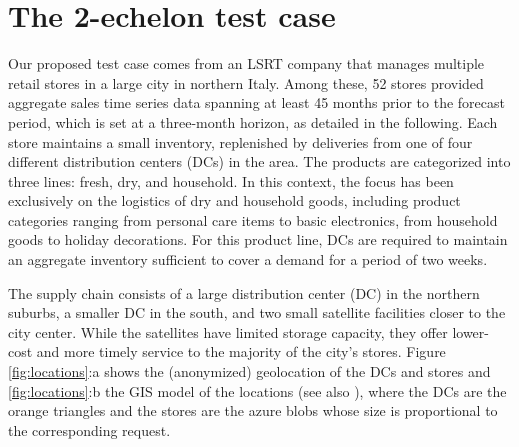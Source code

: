 \documentclass[preprint,11pt,authoryear]{elsarticle}
\begin{document}


\section{The 2-echelon test case} \label{Sec:testcase}

Our proposed test case comes from an LSRT company that manages multiple retail stores in a large city in northern Italy. Among these, 52 stores provided aggregate sales time series data spanning at least 45 months prior to the forecast period, which is set at a three-month horizon, as detailed in the following. Each store maintains a small inventory, replenished by deliveries from one of four different distribution centers (DCs) in the area. The products are categorized into three lines: fresh, dry, and household. In this context, the focus has been exclusively on the logistics of dry and household goods, including product categories ranging from personal care items to basic electronics, from household goods to holiday decorations. For this product line, DCs are required to maintain an aggregate inventory sufficient to cover a demand for a period of two weeks.

The supply chain consists of a large distribution center (DC) in the northern suburbs, a smaller DC in the south, and two small satellite facilities closer to the city center. While the satellites have limited storage capacity, they offer lower-cost and more timely service to the majority of the city's stores. Figure \ref{fig:locations}:a shows the (anonymized) geolocation of the DCs and stores and \ref{fig:locations}:b the GIS model of the locations (see also \citealp{MZ23}), where the DCs are the orange triangles and the stores are the azure blobs whose size is proportional to the corresponding request.
\end{document}
